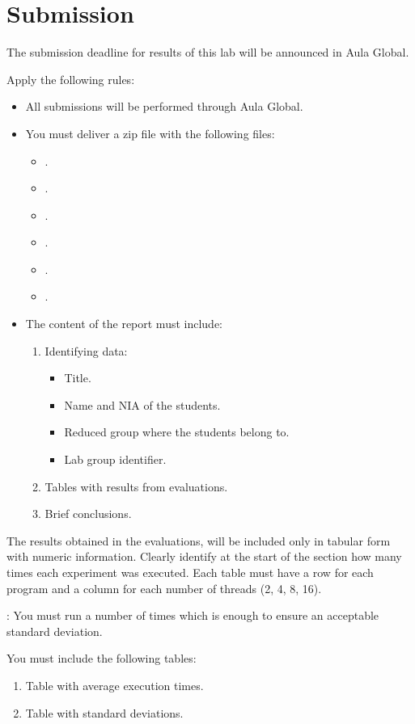 \clearpage
\section{Submission}

The submission deadline for results of this lab will be announced in Aula Global.

Apply the following rules:

\begin{itemize}

  \item All submissions will be performed through Aula Global.

  \item You must deliver a zip file with the following files:
     \begin{itemize}
       \item {}.
       \item {}.
       \item {}.
       \item {}.
       \item {}.
       \item {}.
     \end{itemize}

  \item The content of the report must include:
  \begin{enumerate}
    \item Identifying data:
      \begin{itemize}
        \item Title.
        \item Name and NIA of the students.
        \item Reduced group where the students belong to.
        \item Lab group identifier.
      \end{itemize}

    \item Tables with results from evaluations.

    \item Brief conclusions.

  \end{enumerate}
  
\end{itemize}

The results obtained in the evaluations, will be included only in tabular form
with numeric information.  Clearly identify at the start of the section how
many times each experiment was executed.  Each table must have a row for each
program and a column for each number of threads (2, 4, 8, 16).

: 
You must run a number of times which is enough to ensure an acceptable standard deviation.

You must include the following tables:

\begin{enumerate}
  \item Table with average execution times.
  \item Table with standard deviations.
\end{enumerate}
